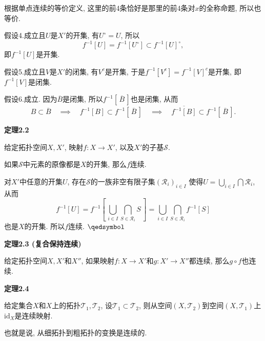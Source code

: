 \documentclass[UTF8]{ctexart}
\begin{document}

根据单点连续的等价定义, 这里的前4条恰好是那里的前4条对$x$的全称命题, 所以也等价.


假设4.成立且$U$是$X'$的开集, 有$U^\circ=U$, 所以
\[
    f^{-1}[U]=f^{-1}[U^\circ]\subset f^{-1}[U]^\circ,
\]
即$f^{-1}[U]$是开集.


假设5.成立且$V$是$X'$的闭集, 有$V^c$是开集, 于是$f^{-1}[V^c]=f^{-1}[V]^c$是开集,
即$f^{-1}[V]$是闭集.


假设6.成立. 因为$\overline{B}$是闭集, 所以$f^{-1}[\,\overline{B}\,]$也是闭集, 从而
\begin{equation*}
    B\subset\overline{B}\quad\implies\quad
    f^{-1}[B]\subset f^{-1}[\,\overline{B}\,]\quad\implies\quad
    \overline{f^{-1}[B]}\subset f^{-1}[\,\overline{B}\,].
\tag*{\qedsymbol}\end{equation*}

\vspace{10pt}

\hypertarget{sec:定理2.2}{}
\noindent\textbf{定理2.2}

给定拓扑空间$X,X'$, 映射$f:X\to X'$, 以及$X'$的子基$\mathcal{S}$.

如果$\mathcal{S}$中元素的原像都是$X$的开集, 那么$f$连续.


对$X'$中任意的开集$U$, 存在$\mathcal{S}$的一族非空有限子集$(\mathcal{R}_i)_{i\in I}$
使得$\displaystyle U=\bigcup_{i\in I}\bigcap\mathcal{R}_i$, 从而
\[
    f^{-1}[U]=f^{-1}\left[\,\bigcup_{i\in I}\bigcap_{S\in\mathcal{R}_i}S\,\right]=
    \bigcup_{i\in I}\bigcap_{S\in\mathcal{R}_i}f^{-1}[S]
\]
也是$X$的开集. 所以$f$连续. \hfill $\qedsymbol$

\vspace{10pt}

\hypertarget{sec:定理2.3}{}
\noindent\textbf{定理2.3 (复合保持连续)}

给定拓扑空间$X,X'$和$X''$,
如果映射$f:X\to X'$和$g:X'\to X''$都连续, 那么$g\circ f$也连续.

\vspace{10pt}

\hypertarget{sec:定理2.4}{}
\noindent\textbf{定理2.4}

给定集合$X$和$X$上的拓扑$\mathcal{T}_1,\mathcal{T}_2$,
设$\mathcal{T}_1\subset\mathcal{T}_2$,
则从空间$(X,\mathcal{T}_2)$到空间$(X,\mathcal{T}_1)$上$\mathrm{id}_X$是连续映射.

也就是说, 从细拓扑到粗拓扑的变换是连续的.

\end{document}
